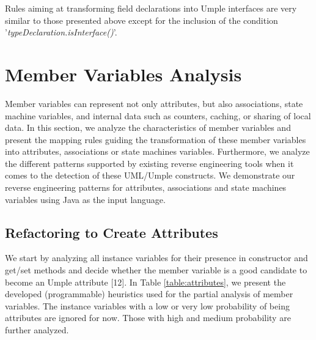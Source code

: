 Rules aiming at transforming field declarations into Umple interfaces are very similar to those presented above except for the inclusion of the condition '\textit{typeDeclaration.isInterface()}'.

\section{Member Variables Analysis}
Member variables can represent not only attributes, but also associations, state machine variables, and internal data such as counters, caching, or sharing of local data. In this section, we analyze the characteristics of member variables and present the mapping rules guiding the transformation of
these member variables into attributes, associations or state machines variables. Furthermore, we analyze the different patterns supported by existing reverse engineering tools when it comes to the detection of these UML/Umple constructs. We demonstrate our reverse engineering patterns for attributes, associations and state machines variables using Java as the input language.  
\subsection{Refactoring to Create Attributes}
 
We start by analyzing all instance variables for their presence in constructor and get/set methods and decide whether the member variable is a good candidate to become an Umple attribute [12].  In Table \ref{table:attributes}, we present the developed (programmable) heuristics used for the partial analysis of member variables. The instance variables with a low or very low probability of being attributes are ignored for now. Those with high and medium probability are further analyzed. 

